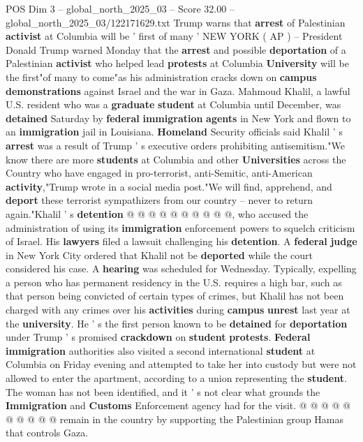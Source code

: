 \begin{textsample}{POS Dim 3 – global\_north\_2025\_03 – Score 32.00 – global\_north\_2025\_03/122171629.txt}  \label{ex:f3_pos_029}
Trump warns that \textbf{arrest} of Palestinian \textbf{activist} at Columbia will be ' first of many ' NEW YORK ( AP ) -- President Donald Trump warned Monday that the \textbf{arrest} and possible \textbf{deportation} of a Palestinian \textbf{activist} who helped lead \textbf{protests} at Columbia \textbf{University} will be the first"of many to come"as his administration cracks down on \textbf{campus} \textbf{demonstrations} against Israel and the war in Gaza.
Mahmoud Khalil, a lawful U.S. resident who was a \textbf{graduate} \textbf{student} at Columbia until December, was \textbf{detained} Saturday by \textbf{federal} \textbf{immigration} \textbf{agents} in New York and flown to an \textbf{immigration} jail in Louisiana. \textbf{Homeland} Security officials said Khalil ' s \textbf{arrest} was a result of Trump ' s executive orders prohibiting antisemitism."We know there are more \textbf{students} at Columbia and other \textbf{Universities} across the Country who have engaged in pro-terrorist, anti-Semitic, anti-American \textbf{activity},"Trump wrote in a social media post."We will find, apprehend, and \textbf{deport} these terrorist sympathizers from our country -- never to return again."Khalil ' s \textbf{detention} @ @ @ @ @ @ @ @ @ @, who accused the administration of using its \textbf{immigration} enforcement powers to squelch criticism of Israel.
His \textbf{lawyers} filed a lawsuit challenging his \textbf{detention}.
A \textbf{federal} \textbf{judge} in New York City ordered that Khalil not be \textbf{deported} while the court considered his case.
A \textbf{hearing} was scheduled for Wednesday.
Typically, expelling a person who has permanent residency in the U.S. requires a high bar, such as that person being convicted of certain types of crimes, but Khalil has not been charged with any crimes over his \textbf{activities} during \textbf{campus} \textbf{unrest} last year at the \textbf{university}.
He ' s the first person known to be \textbf{detained} for \textbf{deportation} under Trump ' s promised \textbf{crackdown} on \textbf{student} \textbf{protests}. \textbf{Federal} \textbf{immigration} authorities also visited a second international \textbf{student} at Columbia on Friday evening and attempted to take her into custody but were not allowed to enter the apartment, according to a union representing the \textbf{student}.
The woman has not been identified, and it ' s not clear what grounds the \textbf{Immigration} and \textbf{Customs} Enforcement agency had for the visit. @ @ @ @ @ @ @ @ @ @ remain in the country by supporting the Palestinian group Hamas that controls Gaza.

\end{textsample}
